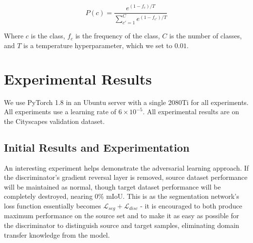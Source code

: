 \documentclass[a4paper,12pt]{report}
\begin{document}
\begin{equation}
    P(c) = \frac{e^{(1-f_c)/T}}{\sum_{c'=1}^{C}{e^{(1-f_{c'})/T}}}
\end{equation}

Where $c$ is the class, $f_c$ is the frequency of the class, $C$ is the number of classes, and $T$ is a temperature hyperparameter, which we set to $0.01$.

\section{Experimental Results}
We use PyTorch 1.8 in an Ubuntu server with a single 2080Ti for all experiments. All experiments use a learning rate of $6 \times 10^{-5}$. All experimental results are on the Cityscapes validation dataset.


\subsection{Initial Results and Experimentation}
An interesting experiment helps demonstrate the adversarial learning approach. If the discriminator's gradient reversal layer is removed, source dataset performance will be maintained as normal, though target dataset performance will be completely destroyed, nearing 0\% mIoU. This is as the segmentation network's loss function essentially becomes $\mathcal{L}_{seg} + \mathcal{L}_{disc}$ - it is encouraged to both produce maximum performance on the source set and to make it as easy as possible for the discriminator to distinguish source and target samples, eliminating domain transfer knowledge from the model.
\end{document}
